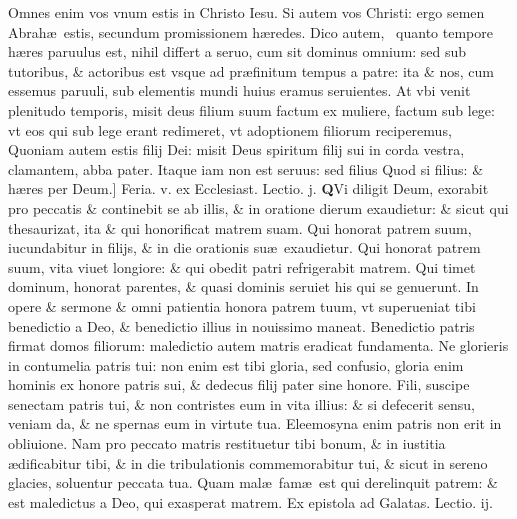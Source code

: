 \documentclass[a5paper,10pt]{book}
\def\leftmarginnote{%
	\lrmarginnote{\hskip -\marginparsep \hskip -6.5em}}
\def\rightmarginnote{%
	\lrmarginnote{\hskip\columnwidth \hskip -1em}}
\def\ae{æ}
\begin{document}
\begin{multicols*}{2}
Omnes enim vos vnum estis in Christo Iesu. Si autem vos Christi: ergo semen Abrah\ae \ estis, secundum promissionem h\ae redes.
Dico autem, \textdagger \ quanto\leftmarginnote{\begin{flushright}c.4.a\end{flushright}} tempore h\ae res paruulus est, nihil differt a seruo, cum sit dominus omnium: sed sub tutoribus, \& actoribus est vsque ad pr\ae finitum tempus a patre: ita \& nos, cum essemus paruuli, sub elementis mundi huius eramus seruientes.
At vbi venit plenitudo temporis, misit deus filium suum factum ex muliere, factum sub lege: vt eos qui sub lege erant redimeret, vt adoptionem filiorum reciperemus, Quoniam autem estis filij Dei: misit Deus spiritum filij sui in corda vestra, clamantem, abba pater.
Itaque iam non est seruus: sed filius Quod si filius: \& h\ae res per Deum.]
\newline {} \color{red} \hypertarget{THU-PRIMA-VAGAN}{Feria. v.} ex Ecclesiast. Lectio. j. \color{black}
\vspace{-.25em}
\lettrine[lines=2]{\bfseries Q}{}Vi\rightmarginnote{ca. 3.} diligit Deum, exorabit pro peccatis \& continebit se ab illis, \& in oratione dierum exaudietur: \& sicut qui thesaurizat, ita \& qui honorificat matrem suam.
Qui honorat patrem suum, iucundabitur in filijs, \& in die orationis su\ae \ exaudietur. Qui honorat patrem suum, vita viuet longiore: \& qui obedit patri refrigerabit matrem.
Qui timet dominum, honorat parentes, \& quasi dominis seruiet his qui se genuerunt. In opere \& sermone \& omni patientia honora patrem tuum, vt superueniat tibi benedictio a Deo, \& benedictio illius in nouissimo maneat.
Benedictio patris firmat domos filiorum: maledictio autem matris eradicat fundamenta. Ne glorieris in contumelia patris tui: non enim est tibi gloria, sed confusio, gloria enim hominis ex honore patris sui, \& dedecus filij pater sine honore.
Fili, suscipe senectam patris tui, \& non contristes eum in vita illius: \& si defecerit sensu, veniam da, \& ne spernas eum in virtute tua. Eleemosyna enim patris non erit in obliuione.
Nam pro peccato matris restituetur tibi bonum, \& in iustitia \ae dificabitur tibi, \& in die tribulationis commemorabitur tui, \& sicut in sereno glacies, soluentur peccata tua.
Quam mal\ae \ fam\ae \ est qui derelinquit patrem: \& est maledictus a Deo, qui exasperat matrem.
\newline \color{red} Ex epistola ad Galatas. \hfill Lectio. ij. \color{black}
\vspace{-.25em}

\end{multicols*}
\end{document}
